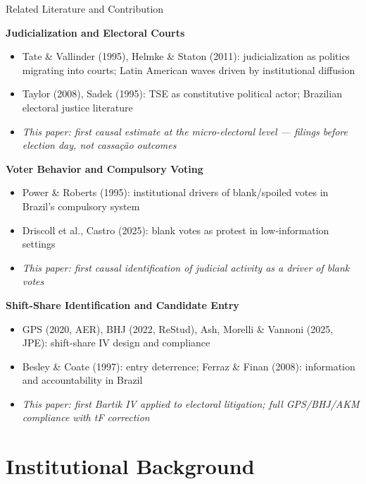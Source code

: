 \documentclass[aspectratio=169,10pt]{beamer}
\begin{document}
\begin{frame}{Related Literature and Contribution}
\footnotesize

\textbf{Judicialization and Electoral Courts}
\begin{itemize}\itemsep1pt
  \item Tate \& Vallinder (1995), Helmke \& Staton (2011): judicialization as politics migrating into courts; Latin American waves driven by institutional diffusion
  \item Taylor (2008), Sadek (1995): TSE as constitutive political actor; Brazilian electoral justice literature
  \item[\color{myblue}$\hookrightarrow$] \textcolor{myblue}{\textit{This paper: first causal estimate at the micro-electoral level --- filings before election day, not cassação outcomes}}
\end{itemize}

\medskip
\textbf{Voter Behavior and Compulsory Voting}
\begin{itemize}\itemsep1pt
  \item Power \& Roberts (1995): institutional drivers of blank/spoiled votes in Brazil's compulsory system
  \item Driscoll et al., Castro (2025): blank votes as protest in low-information settings
  \item[\color{myblue}$\hookrightarrow$] \textcolor{myblue}{\textit{This paper: first causal identification of judicial activity as a driver of blank votes}}
\end{itemize}

\medskip
\textbf{Shift-Share Identification and Candidate Entry}
\begin{itemize}\itemsep1pt
  \item GPS (2020, AER), BHJ (2022, ReStud), Ash, Morelli \& Vannoni (2025, JPE): shift-share IV design and compliance
  \item Besley \& Coate (1997): entry deterrence; Ferraz \& Finan (2008): information and accountability in Brazil
  \item[\color{myblue}$\hookrightarrow$] \textcolor{myblue}{\textit{This paper: first Bartik IV applied to electoral litigation; full GPS/BHJ/AKM compliance with tF correction}}
\end{itemize}
\normalsize
\end{frame}


\section{Institutional Background}
\end{document}
